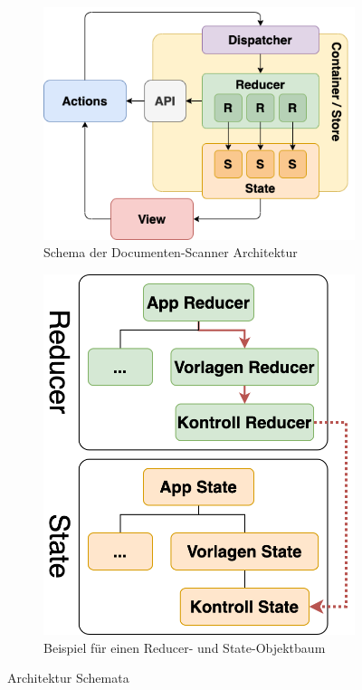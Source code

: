 \documentclass[notables, nomenclature, oneside, 150]{HSMW-Thesis}
\begin{document}
		\begin{figure}[h!]
			\centering
			\begin{subfigure}[t]{0.48\textwidth}
				\centering
				\includegraphics[width=\textwidth]{img/redux.png}
				\caption{Schema der Documenten-Scanner Architektur}
				\label{fig:redux}
			\end{subfigure}
			\begin{subfigure}[t]{0.48\textwidth}
				\centering
				\includegraphics[height=0.9\textwidth]{img/tree_example.png}
				\caption{Beispiel für einen Reducer- und State-Objektbaum}
				\label{fig:tree}
			\end{subfigure}
			\caption{Architektur Schemata}
		\end{figure}
		
\end{document}
